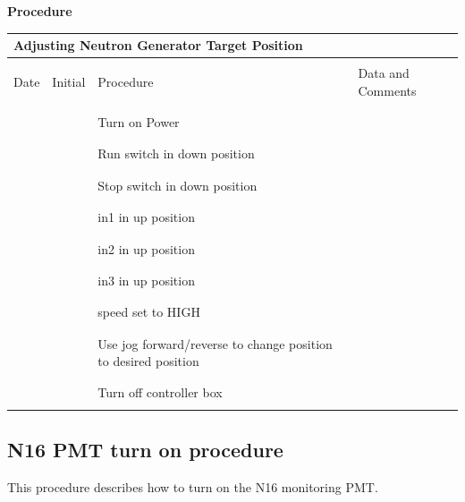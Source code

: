 \documentclass[10pt]{article}
\begin{document}
{\bf Procedure}

\begin{center}
\begin{tabular}{|c|c|p{7cm}|l|}
\hline
\multicolumn{4}{|l|}{Adjusting Neutron Generator Target Position}\\
\hline
& & & \\
Date & Initial & Procedure & Data and Comments \\
& & & \\
\hline
& & & \\
& & Turn on Power & \\
& & & \\
\hline
& & & \\
& & Run switch in down position & \\
& & & \\
\hline
& & & \\
& & Stop switch in down position & \\
& & & \\
\hline
& & & \\
& & in1 in up position & \\
& & & \\
\hline
& & & \\
& & in2 in up position & \\
& & & \\
\hline
& & & \\
& & in3 in up position & \\
& & & \\
\hline
& & & \\
& & speed set to HIGH & \\
& & & \\
\hline
& & & \\
& & Use jog forward/reverse to change position to desired position & \\
& & & \\
\hline
& & & \\
& & Turn off controller box & \\
& & & \\
\hline
\end{tabular}
\end{center}

\subsection{ N16 PMT turn on procedure}

This procedure describes how to turn on the N16 monitoring PMT.
\end{document}
